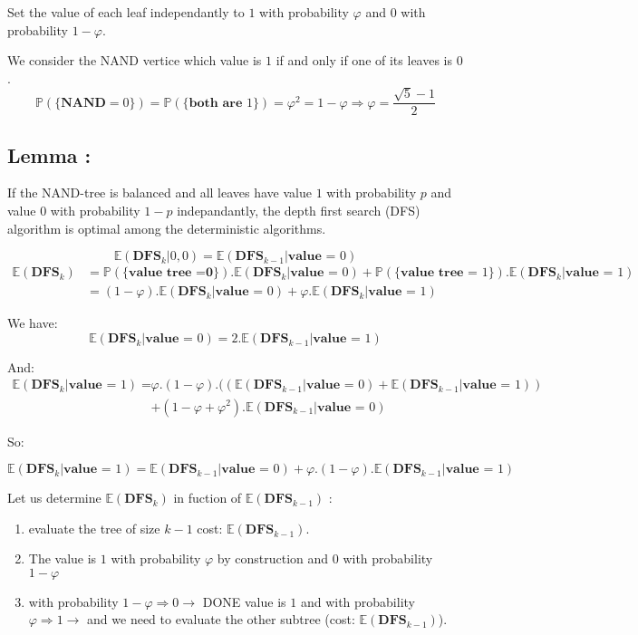 \documentclass[12pt,a4paper]{article}
\begin{document}
Set the value of each leaf independantly to $1$ with probability $\varphi$ and $0$ with probability $1-\varphi$.

We consider the NAND vertice which value is $1$ if and only if one of its leaves is $0$.
$$\displaystyle{\mathbb{P}(\{\textbf{NAND}=0\}) = \mathbb{P}(\{\textbf{both are }1\}) = \varphi^{2}=1-\varphi \Rightarrow \varphi = \frac{\sqrt{5}-1}{2}}$$

\subsection*{Lemma :}
If the NAND-tree is balanced and all leaves have value $1$ with probability $p$ and value $0$ with probability $1-p$ indepandantly, the depth first search (DFS) algorithm is optimal among the deterministic algorithms.

$$\mathbb{E}(\textbf{DFS}_{k} | 0,0) = \mathbb{E}(\textbf{DFS}_{k-1}|\textbf{value = }0)$$
$$\begin{array}{cl}\mathbb{E}(\textbf{DFS}_{k}) &= \mathbb{P}(\{\textbf{value tree =0}\}).\mathbb{E}(\textbf{DFS}_{k} | \textbf{value = }0 )+ \mathbb{P}(\{\textbf{value tree = }1\}).\mathbb{E}(\textbf{DFS}_{k} | \textbf{value = }1 )\\
 
&=(1-\varphi).\mathbb{E}(\textbf{DFS}_{k} | \textbf{value = }0 )+ \varphi .\mathbb{E}(\textbf{DFS}_{k} | \textbf{value = }1 )
\end{array}$$


We have:
$$\mathbb{E}(\textbf{DFS}_{k} | \textbf{value = }0 )=2.\mathbb{E}(\textbf{DFS}_{k-1} | \textbf{value = }1 )$$

And:
$$\begin{array}{cl}\mathbb{E}(\textbf{DFS}_{k} | \textbf{value = }1 )=&\varphi.(1-\varphi).((\mathbb{E}(\textbf{DFS}_{k-1} | \textbf{value = }0 )+\mathbb{E}(\textbf{DFS}_{k-1} | \textbf{value = }1))\\
& +(1-\varphi+\varphi^{2}).\mathbb{E}(\textbf{DFS}_{k-1} | \textbf{value = }0)
\end{array}$$

So:

$$\mathbb{E}(\textbf{DFS}_{k} | \textbf{value = }1 )= \mathbb{E}(\textbf{DFS}_{k-1} | \textbf{value = }0)+\varphi.(1-\varphi).\mathbb{E}(\textbf{DFS}_{k-1} | \textbf{value = }1)$$

Let us determine $\mathbb{E}(\textbf{DFS}_{k})$ in fuction of $\mathbb{E}(\textbf{DFS}_{k-1})$ :

\begin{enumerate}
\item evaluate the tree of size $k-1$ cost: $\mathbb{E}(\textbf{DFS}_{k-1})$.
\item The value is $1$ with probability $\varphi$ by construction and 0 with probability $1-\varphi$
\item with probability $1-\varphi \Rightarrow 0 \rightarrow$ DONE value is $1$ and with probability $\varphi \Rightarrow 1 \rightarrow$ and we need to evaluate the other subtree (cost: $\mathbb{E}(\textbf{DFS}_{k-1})$).
\end{enumerate}
\end{document}
